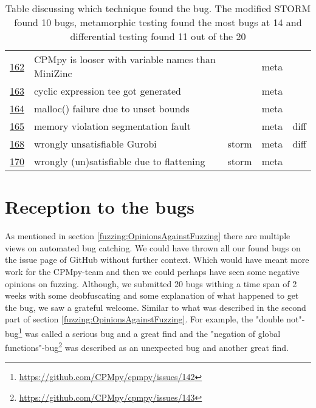 \begin{table}[]
\begin{tabular}{lllll}
		\href{https://github.com/CPMpy/cpmpy/issues/162}{162} & CPMpy is looser with variable names than MiniZinc &       & meta  &      \\
		\href{https://github.com/CPMpy/cpmpy/issues/163}{163} & cyclic expression tee got generated               &       & meta  &      \\
		\href{https://github.com/CPMpy/cpmpy/issues/164}{164} & malloc() failure due to unset bounds              &       & meta  &      \\
		\href{https://github.com/CPMpy/cpmpy/issues/165}{165} & memory violation segmentation fault               &       & meta  & diff \\
		\href{https://github.com/CPMpy/cpmpy/issues/168}{168} & wrongly unsatisfiable Gurobi                      & storm & meta  & diff \\
		\href{https://github.com/CPMpy/cpmpy/issues/170}{170} & wrongly (un)satisfiable due to flattening         & storm & meta  &      \\ \bottomrule
	\end{tabular}
	\caption{Table discussing which technique found the bug. The modified STORM found 10 bugs, metamorphic testing found the most bugs at 14 and differential testing found 11 out of the 20}
	\label{tab:bug:Technique}
\end{table}


\section{Reception to the bugs} 
As mentioned in section \ref{fuzzing:OpinionsAgainstFuzzing} there are multiple views on automated bug catching. We could have thrown all our found bugs on the issue page of GitHub without further context. Which would have meant more work for the CPMpy-team and then we could perhaps have seen some negative opinions on fuzzing. 
Although, we submitted 20 bugs withing a time span of 2 weeks with some deobfuscating and some explanation of what happened to get the bug, we saw a grateful welcome. Similar to what was described in the second part of section \ref{fuzzing:OpinionsAgainstFuzzing}. 
For example, the "double not"-bug\footnote{\url{https://github.com/CPMpy/cpmpy/issues/142}} was called a serious bug and a great find and 
the "negation of global functions"-bug\footnote{\url{https://github.com/CPMpy/cpmpy/issues/143}} was described as an unexpected bug and another great find.

